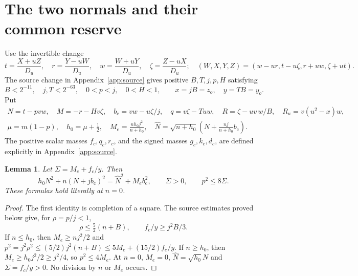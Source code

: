 \documentclass[10pt]{article}
\newtheorem{lemma}{Lemma}
\newcommand{\half}{\tfrac12}
\newcommand{\bc}{b_{\mathrm c}}
\begin{document}
\section{The two normals and their common reserve}
Use the invertible change
\begin{equation}
 t=\frac{X+uZ}{D_u},\quad r=\frac{Y-uW}{D_u},\quad
 w=\frac{W+uY}{D_u},\quad \zeta=\frac{Z-uX}{D_u};
 \quad
 (W,X,Y,Z)=(w-ur,t-u\zeta,r+uw,\zeta+ut).
 \label{eq:rotation}
\end{equation}
The source change in Appendix~\ref{app:source} gives positive $B,T,j,p,H$
satisfying
\begin{equation}
 B<2^{-11},\quad j,T<2^{-63},\quad 0<p<j,\quad 0<H<1,
 \qquad x=jB=z_o,\quad y=TB=y_o.
 \label{eq:box}
\end{equation}
Put
\begin{gather}
 N=t-pvw,\quad M=-r-Hv\zeta,\quad
 \bc=vw-u\zeta/j,\quad q=v\zeta-Tuw,\quad
 R=\zeta-uv\,w/B,\quad R_u=v(u^2-x)w, \label{eq:rows}\\
 \mu=m(1-p),\quad h_0=\mu+\half,\quad
 M_e=\frac{nh_0j^2}{n+h_0},\quad
 \widehat N=\sqrt{n+h_0}\left(N+\frac{nj}{n+h_0}\bc\right).
 \label{eq:harmonic}
\end{gather}
The positive scalar masses $f_c,q_c,r_c$, and the signed masses $g_c,k_c,d_c$,
are defined explicitly in Appendix~\ref{app:source}.

\begin{lemma}\label{lem:budget}
Let $\Sigma=M_e+f_c/y$. Then
\begin{equation}
 h_0N^2+n(N+j\bc)^2=\widehat N^2+M_e\bc^2,\qquad
 \Sigma>0,\qquad p^2\leq8\Sigma. \label{eq:budget}
\end{equation}
These formulas hold literally at $n=0$.
\end{lemma}
\begin{proof}
The first identity is completion of a square. The source estimates proved
below give, for $\rho=p/j<1$,
\[
 \rho\leq\tfrac52(n+B),\qquad f_c/y\geq j^2B/3.
\]
If $n\leq h_0$, then $M_e\geq nj^2/2$ and
$p^2=j^2\rho^2\leq(5/2)j^2(n+B)
\leq5M_e+(15/2)f_c/y$. If $n\geq h_0$, then
$M_e\geq h_0j^2/2\geq j^2/4$, so $p^2\leq4M_e$.
At $n=0$, $M_e=0$, $\widehat N=\sqrt{h_0}N$ and $\Sigma=f_c/y>0$.
No division by $n$ or $M_e$ occurs.
\end{proof}
\end{document}
